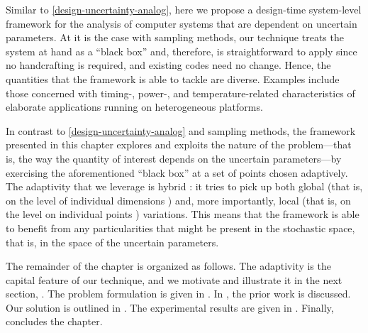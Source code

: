 Similar to \cref{design-uncertainty-analog}, here we propose a design-time
system-level framework for the analysis of computer systems that are dependent
on uncertain parameters. At it is the case with sampling methods, our technique
treats the system at hand as a ``black box'' and, therefore, is straightforward
to apply since no handcrafting is required, and existing codes need no change.
Hence, the quantities that the framework is able to tackle are diverse. Examples
include those concerned with timing-, power-, and temperature-related
characteristics of elaborate applications running on heterogeneous platforms.

In contrast to \cref{design-uncertainty-analog} and sampling methods, the
framework presented in this chapter explores and exploits the nature of the
problem---that is, the way the quantity of interest depends on the uncertain
parameters---by exercising the aforementioned ``black box'' at a set of points
chosen adaptively. The adaptivity that we leverage is hybrid \cite{jakeman2012}:
it tries to pick up both global (that is, on the level of individual dimensions
\cite{klimke2006}) and, more importantly, local (that is, on the level on
individual points \cite{ma2009}) variations. This means that the framework is
able to benefit from any particularities that might be present in the stochastic
space, that is, in the space of the uncertain parameters.

The remainder of the chapter is organized as follows. The adaptivity is the
capital feature of our technique, and we motivate and illustrate it in the next
section, . The problem formulation is given in
. In , the prior work is
discussed. Our solution is outlined in . The
experimental results are given in . Finally,
 concludes the chapter.

